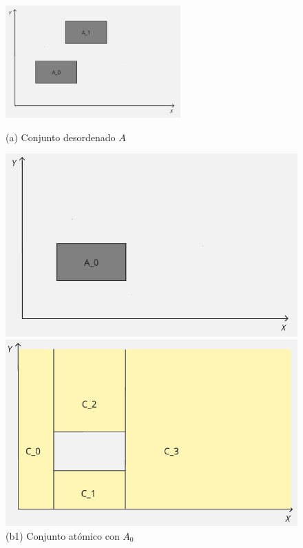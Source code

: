 \begin{figure}[H]
    \centering
    
    \includegraphics[width=0.6\textwidth]{figures/Conceptos previos/Conjuntos/conjuntoAcomp.png}
    \caption*{(a) Conjunto desordenado $A$}
    
    \vspace{1em}
    
    \begin{minipage}{0.31\textwidth}
        \centering
        \includegraphics[width=\textwidth]{figures/Conceptos previos/Conjuntos/iter1comp.png}
        \caption*{    \centering (b1) Conjunto atómico con $A_0$}
    \end{minipage}
    \begin{minipage}{0.31\textwidth}
        \centering
        \includegraphics[width=\textwidth]{figures/Conceptos previos/Conjuntos/iter1compA.png}
        

\end{minipage}
\end{figure}
